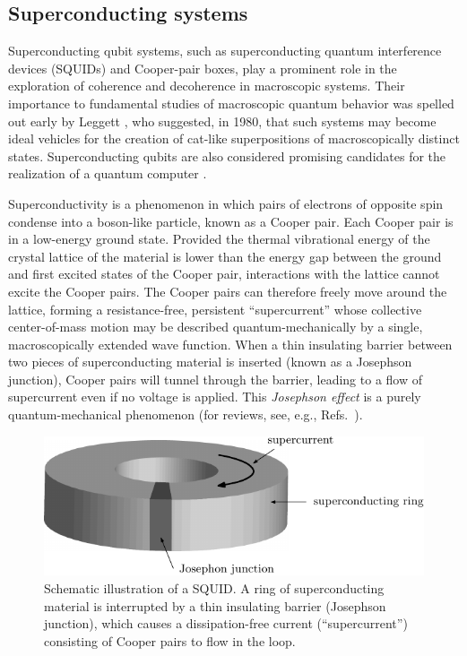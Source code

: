 \documentclass[3p,sort&compress]{elsarticle}
\begin{document}
\subsection{\label{sec:superc-syst}Superconducting systems}

Superconducting qubit systems, such as superconducting quantum interference devices (SQUIDs) and Cooper-pair boxes, play a prominent role in the exploration of coherence and decoherence in macroscopic systems. Their importance to fundamental studies of macroscopic quantum behavior was spelled out early by Leggett \cite{Leggett:1980:yt}, who suggested, in 1980, that such systems may become ideal vehicles for the creation of cat-like superpositions of macroscopically distinct states. Superconducting qubits are also considered promising candidates for the realization of a quantum computer \cite{Devoret:2013:pp}. 

Superconductivity is a phenomenon in which pairs of electrons of opposite spin condense into a boson-like particle, known as a Cooper pair. Each Cooper pair is in a low-energy ground  state. Provided the thermal vibrational energy of the crystal lattice of the material is lower than the energy gap between the ground and first excited states of the Cooper pair, interactions with the lattice cannot excite the Cooper pairs. The Cooper pairs can therefore freely move around the lattice, forming a resistance-free, persistent ``supercurrent'' whose collective center-of-mass motion may be described quantum-mechanically by a single, macroscopically extended wave function. When a thin insulating barrier between two pieces of superconducting material is inserted (known as a Josephson junction), Cooper pairs will tunnel through the barrier, leading to a flow of supercurrent even if no voltage is applied. This \emph{Josephson effect} is a purely quantum-mechanical phenomenon (for reviews, see, e.g., Refs.~\cite{Likharev:1979:ii,Makhlin:2001:oo}). 

\begin{figure}
  \centering
\includegraphics[scale=0.65]{squidscheme.pdf}
  \caption{Schematic illustration of a SQUID. A ring of superconducting material is interrupted by a thin insulating barrier (Josephson junction), which causes a dissipation-free current (``supercurrent'') consisting of Cooper pairs to flow in the loop.}
\label{fig:squidscheme} 
\end{figure}
\end{document}
